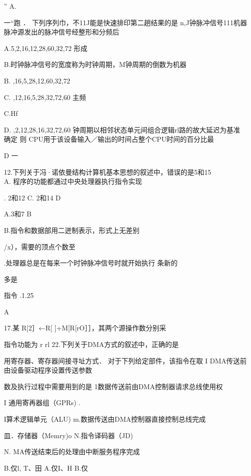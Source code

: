     ”    A.

    一“跑 ． 下列序列巾，不11J能是快速排印第二趟结果的是    n,J钟脉冲信号111机器脉冲源发出的脉冲信号经整形和分频后

    A.5,2,16,12,28,60,32,72    形成

    B.时钟脉冲信号的宽度称为时钟周期，M钟周期的倒数为机器

    B. ,16,5,28,12,60,32,72

    C. ,12,16,5,28,32,72,60    主频

    C.Hf

    D. ,2,12,28,16,32,72,60    钟周期以相邻状态单元间组合逻辑rl路的故大延迟为基准    确定    则 CPU用于该设备输入／输出的时间占整个CPU时间的百分比最

   D    一




12.下列关于冯·诺依曼结构计算机基本思想的叙述中，错误的是5和15 \\
A. 程序的功能都通过中央处理器执行指令实现

    . 2和12    C. 2和14    D

  A.3和7    B

    B.指令和数据部用二迸制表示，形式上无差别

    /x），需要的顶点个数至


    .处理器总是在每来一个时钟脉冲信号时就开始执行  条新的

    多是

    指令    .1.25%

    A

17.某    R[2］←R[ ]+M[R[rO］］，其两个源操作数分别采

    指令功能为   r    rl    22.下列关于DMA方式的叙述中，正确的是

   用寄存器、寄存器间接寻址方式． 对于下列给定部件，该指令在取    I DMA传送前由设备驱动程序设置传送参数

   数及执行过程中需要用到的是    1数据传送前由DMA控制器请求总线使用权

   I 通用寄再器组（GPRs)    .

    I算术逻辑单元（ALU)    m.数据传送由DMA控制器直接控制总线完成

   皿．存储器（Memry)o    N.指令译码器（JD)

    N. MA传送结束后的处理由中断服务程序完成

    B.仅l, T、田    A.仅I、H    B.仅

